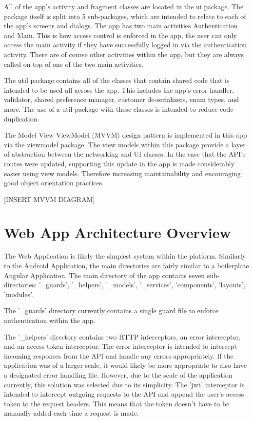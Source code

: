 All of the app's activity and fragment classes are located in the ui package. The package itself is split into 5 sub-packages, which are intended to relate to each of the app's screens and dialogs. The app has two main activities Authentication and Main. This is how access control is enforced in the app, the user can only access the main activity if they have successfully logged in via the authentication activity. There are of course other activities within the app, but they are always called on top of one of the two main activities.

The util package contains all of the classes that contain shared code that is intended to be used all across the app. This includes the app's error handler, validator, shared preference manager, customer de-serializers, enum types, and more. The use of a util package with these classes is intended to reduce code duplication.

The Model View ViewModel (MVVM) design pattern is implemented in this app via the viewmodel package. The view models within this package provide a layer of abstraction between the networking and UI classes. In the case that the API's routes were updated, supporting this update in the app is made considerably easier using view models. Therefore increasing maintainability and encouraging good object orientation practices.

[INSERT MVVM DIAGRAM]

\section{Web App Architecture Overview}
The Web Application is likely the simplest system within the platform. Similarly to the Android Application, the main directories are fairly similar to a boilerplate Angular Application. The main directory of the app contains seven sub-directories: '\_guards', '\_helpers', '\_models', '\_services', 'components', 'layouts', 'modules'.

The '\_guards' directory currently contains a single guard file to enforce authentication within the app.

The '\_helpers' directory contains two HTTP interceptors, an error interceptor, and an access token interceptor. The error interceptor is intended to intercept incoming responses from the API and handle any errors appropriately. If the application was of a larger scale, it would likely be more appropriate to also have a designated error handling file. However, due to the scale of the application currently, this solution was selected due to its simplicity. The 'jwt' interceptor is intended to intercept outgoing requests to the API and append the user's access token to the request headers. This means that the token doesn't have to be manually added each time a request is made.

